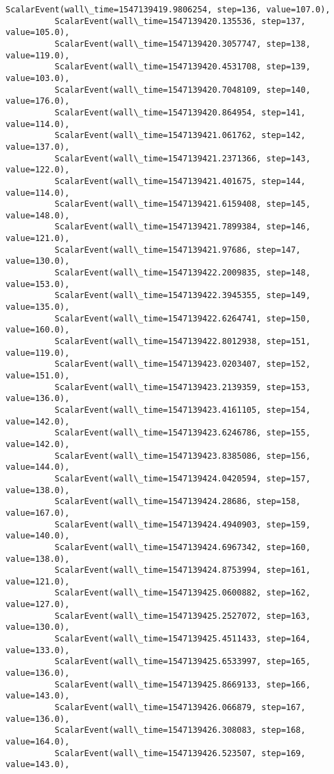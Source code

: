 \documentclass[11pt]{article}
\begin{document}
\begin{Verbatim}[commandchars=\\\{\}]
          ScalarEvent(wall\_time=1547139419.9806254, step=136, value=107.0),
          ScalarEvent(wall\_time=1547139420.135536, step=137, value=105.0),
          ScalarEvent(wall\_time=1547139420.3057747, step=138, value=119.0),
          ScalarEvent(wall\_time=1547139420.4531708, step=139, value=103.0),
          ScalarEvent(wall\_time=1547139420.7048109, step=140, value=176.0),
          ScalarEvent(wall\_time=1547139420.864954, step=141, value=114.0),
          ScalarEvent(wall\_time=1547139421.061762, step=142, value=137.0),
          ScalarEvent(wall\_time=1547139421.2371366, step=143, value=122.0),
          ScalarEvent(wall\_time=1547139421.401675, step=144, value=114.0),
          ScalarEvent(wall\_time=1547139421.6159408, step=145, value=148.0),
          ScalarEvent(wall\_time=1547139421.7899384, step=146, value=121.0),
          ScalarEvent(wall\_time=1547139421.97686, step=147, value=130.0),
          ScalarEvent(wall\_time=1547139422.2009835, step=148, value=153.0),
          ScalarEvent(wall\_time=1547139422.3945355, step=149, value=135.0),
          ScalarEvent(wall\_time=1547139422.6264741, step=150, value=160.0),
          ScalarEvent(wall\_time=1547139422.8012938, step=151, value=119.0),
          ScalarEvent(wall\_time=1547139423.0203407, step=152, value=151.0),
          ScalarEvent(wall\_time=1547139423.2139359, step=153, value=136.0),
          ScalarEvent(wall\_time=1547139423.4161105, step=154, value=142.0),
          ScalarEvent(wall\_time=1547139423.6246786, step=155, value=142.0),
          ScalarEvent(wall\_time=1547139423.8385086, step=156, value=144.0),
          ScalarEvent(wall\_time=1547139424.0420594, step=157, value=138.0),
          ScalarEvent(wall\_time=1547139424.28686, step=158, value=167.0),
          ScalarEvent(wall\_time=1547139424.4940903, step=159, value=140.0),
          ScalarEvent(wall\_time=1547139424.6967342, step=160, value=138.0),
          ScalarEvent(wall\_time=1547139424.8753994, step=161, value=121.0),
          ScalarEvent(wall\_time=1547139425.0600882, step=162, value=127.0),
          ScalarEvent(wall\_time=1547139425.2527072, step=163, value=130.0),
          ScalarEvent(wall\_time=1547139425.4511433, step=164, value=133.0),
          ScalarEvent(wall\_time=1547139425.6533997, step=165, value=136.0),
          ScalarEvent(wall\_time=1547139425.8669133, step=166, value=143.0),
          ScalarEvent(wall\_time=1547139426.066879, step=167, value=136.0),
          ScalarEvent(wall\_time=1547139426.308083, step=168, value=164.0),
          ScalarEvent(wall\_time=1547139426.523507, step=169, value=143.0),

\end{Verbatim}
\end{document}
